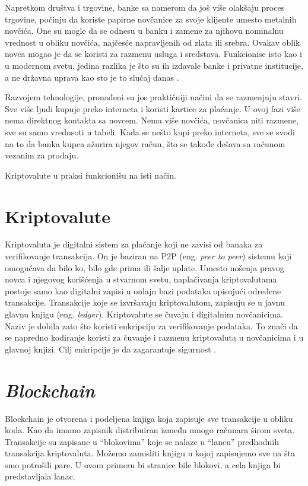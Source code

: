\documentclass[a4paper]{article}
\begin{document}
{Napretkom društva i trgovine,  banke sa namerom da još više olakšaju proces trgovine, počinju da koriste papirne novčanice za svoje klijente umesto metalnih novčića.  One su mogle da se odnesu u banku i zamene za njihovu nominalnu vrednost u obliku novčića, najčesće napravljenih od zlata ili srebra. Ovakav oblik novca mogao je da se koristi za razmenu usluga i sredstava. Funkcionise isto kao i u modernom svetu, jedina razlika je što su ih izdavale banke i privatne institucije, a ne državna uprava kao sto je to slučaj danas \cite{istorijanovca}.

Razvojem tehnologije, pronađeni su jos praktičniji načini da se razmenjuju stavri. Sve više ljudi kupuje preko interneta i koristi kartice za plaćanje. U ovoj fazi više nema direktnog kontakta sa novcem. Nema više novčića, novčanica niti razmene, sve su samo vrednsoti u tabeli. Kada se nešto kupi preko interneta, sve se svodi na to da banka kupca ažurira njegov račun, što se takođe dešava sa računom vezanim za prodaju.

Kriptovalute u praksi funkcionišu na isti način.


\section{Kriptovalute}
\label{sec:kriptovalute}
Kriptovaluta je digitalni sistem za plaćanje koji ne zavisi od banaka za verifikovanje transakcija. On je baziran na P2P (eng. \emph{peer to peer}) sistemu koji omogućava da bilo ko, bilo gde prima ili šalje uplate. Umesto nošenja pravog novca i njegovog korišćenja u stvarnom svetu, naplaćivanja kriptovalutama postoje samo kao digitalni zapisi u onlajn bazi podataka opisujući određene transakcije. Transakcije koje se izvršavaju kriptovalutom, zapisuju se u javnu glavnu knjigu (eng. \emph{ledger}). Kriptovalute se čuvaju i digitalnim novčanicima.
Naziv je dobila zato što koristi enkripciju za verifikovanje podataka. To znači da se napredno kodiranje koristi za čuvanje i razmenu kriptovaluta u novčanicima i u glavnoj knjizi. Cilj enkripcije je da zagarantuje sigurnost \cite{kriptovalute1}.


\section{\emph{Blockchain}}
\label{sec:blockchain}
Blockchain je otvorena i podeljena knjiga koja zapisuje sve transakcije u obliku koda. Kao da imamo zapisnik distribuiran između mnogo računara širom sveta. Transakcije su zapisane u ``blokovima'' koje se nalaze u ``lancu'' predhodnih transakcija kriptovaluta. Možemo zamisliti knjigu u kojoj zapisujemo sve na šta smo potrošili pare. U ovom primeru bi stranice bile blokovi, a cela knjiga bi predstavljala lanac.

}
\end{document}
